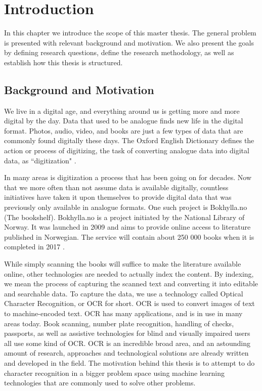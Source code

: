 
\chapter{Introduction}
In this chapter we introduce the scope of this master thesis. The general problem is presented with relevant background and motivation. We also present the goals by defining research questions, define the research methodology, as well as establish how this thesis is structured.

\section{Background and Motivation}
We live in a digital age, and everything around us is getting more and more digital by the day. Data that used to be analogue finds new life in the digital format. Photos, audio, video, and books are just a few types of data that are commonly found digitally these days. The Oxford English Dictionary defines the action or process of digitizing, the task of converting analogue data into digital data, as ``digitization" \cite{misc-oed-digitization}.

In many areas is digitization a process that has been going on for decades. Now that we more often than not assume data is available digitally, countless initiatives have taken it upon themselves to provide digital data that was previously only available in analogue formats. One such project is Bokhylla.no (The bookshelf). Bokhylla.no is a project initiated by the National Library of Norway. It was launched in 2009 and aims to provide online access to literature published in Norwegian. The service will contain about 250 000 books when it is completed in 2017 \cite{misc-nb-digial-library}.

While simply scanning the books will suffice to make the literature available online, other technologies are needed to actually index the content. By indexing, we mean the process of capturing the scanned text and converting it into editable and searchable data. To capture the data, we use a technology called Optical Character Recognition, or OCR for short. OCR is used to convert images of text to machine-encoded text. OCR has many applications, and is in use in many areas today. Book scanning, number plate recognition, handling of checks, passports, as well as assistive technologies for blind and visually impaired users all use some kind of OCR. OCR is an incredible broad area, and an astounding amount of research, approaches and technological solutions are already written and developed in the field. The motivation behind this thesis is to attempt to do character recognition in a bigger problem space using machine learning technologies that are commonly used to solve other problems.

